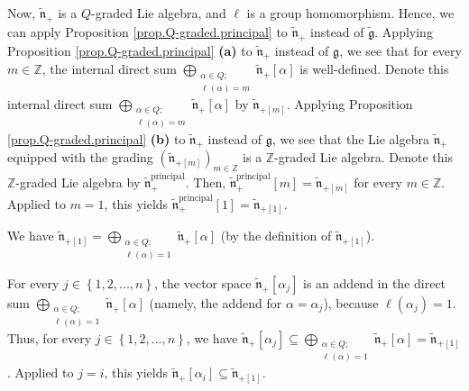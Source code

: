 \documentclass[etingof-lie.tex]{subfiles}
\begin{document}
\begin{verlong}
Now, $\widetilde{\mathfrak{n}}_{+}$ is a $Q$-graded Lie algebra, and $\ell$ is
a group homomorphism. Hence, we can apply Proposition
\ref{prop.Q-graded.principal} to $\widetilde{\mathfrak{n}}_{+}$ instead of
$\widetilde{\mathfrak{g}}$. Applying Proposition \ref{prop.Q-graded.principal}
\textbf{(a)} to $\widetilde{\mathfrak{n}}_{+}$ instead of $\mathfrak{g}$, we
see that for every $m\in\mathbb{Z}$, the internal direct sum $\bigoplus
\limits_{\substack{\alpha\in Q;\\\ell\left(  \alpha\right)  =m}%
}\widetilde{\mathfrak{n}}_{+}\left[  \alpha\right]  $ is well-defined. Denote
this internal direct sum $\bigoplus\limits_{\substack{\alpha\in Q;\\\ell
\left(  \alpha\right)  =m}}\widetilde{\mathfrak{n}}_{+}\left[  \alpha\right]
$ by $\widetilde{\mathfrak{n}}_{+\left[  m\right]  }$. Applying Proposition
\ref{prop.Q-graded.principal} \textbf{(b)} to $\widetilde{\mathfrak{n}}_{+}$
instead of $\mathfrak{g}$, we see that the Lie algebra
$\widetilde{\mathfrak{n}}_{+}$ equipped with the grading $\left(
\widetilde{\mathfrak{n}}_{+\left[  m\right]  }\right)  _{m\in\mathbb{Z}}$ is a
$\mathbb{Z}$-graded Lie algebra. Denote this $\mathbb{Z}$-graded Lie algebra
by $\widetilde{\mathfrak{n}}_{+}^{\operatorname*{principal}}$. Then,
$\widetilde{\mathfrak{n}}_{+}^{\operatorname*{principal}}\left[  m\right]
=\widetilde{\mathfrak{n}}_{+\left[  m\right]  }$ for every $m\in\mathbb{Z}$.
Applied to $m=1$, this yields $\widetilde{\mathfrak{n}}_{+}%
^{\operatorname*{principal}}\left[  1\right]  =\widetilde{\mathfrak{n}%
}_{+\left[  1\right]  }$.

We have $\widetilde{\mathfrak{n}}_{+\left[  1\right]  }=\bigoplus
\limits_{\substack{\alpha\in Q;\\\ell\left(  \alpha\right)  =1}%
}\widetilde{\mathfrak{n}}_{+}\left[  \alpha\right]  $ (by the definition of
$\widetilde{\mathfrak{n}}_{+\left[  1\right]  }$).

For every $j\in\left\{  1,2,...,n\right\}  $, the vector space
$\widetilde{\mathfrak{n}}_{+}\left[  \alpha_{j}\right]  $ is an addend in the
direct sum $\bigoplus\limits_{\substack{\alpha\in Q;\\\ell\left(
\alpha\right)  =1}}\widetilde{\mathfrak{n}}_{+}\left[  \alpha\right]  $
(namely, the addend for $\alpha=\alpha_{j}$), because $\ell\left(  \alpha
_{j}\right)  =1$. Thus, for every $j\in\left\{  1,2,...,n\right\}  $, we have
$\widetilde{\mathfrak{n}}_{+}\left[  \alpha_{j}\right]  \subseteq
\bigoplus\limits_{\substack{\alpha\in Q;\\\ell\left(  \alpha\right)
=1}}\widetilde{\mathfrak{n}}_{+}\left[  \alpha\right]
=\widetilde{\mathfrak{n}}_{+\left[  1\right]  }$. Applied to $j=i$, this
yields $\widetilde{\mathfrak{n}}_{+}\left[  \alpha_{i}\right]  \subseteq
\widetilde{\mathfrak{n}}_{+\left[  1\right]  }$.


\end{verlong}
\end{document}
